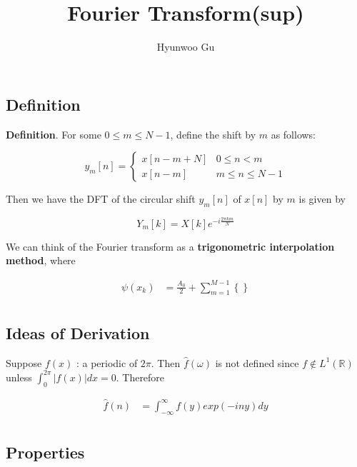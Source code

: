 \documentclass[12pt]{article}
\theoremstyle{nonumberbreak}
\begin{document}
\title{\textbf{Fourier Transform(sup)}}
\author{Hyunwoo Gu}
\date{}

\maketitle

\subsection*{Definition}


\begin{theorem}
\textbf{Definition}. For some $0 \le m \le N-1$, define the shift by $m$ as follows:

$$
y_m[n] = \begin{cases} 
x[n-m+N] & 0 \le n < m \\
x[n-m] & m \le n \le N-1
\end{cases}
$$

Then we have the DFT of the circular shift $y_m[n]$ of $x[n]$ by $m$ is given by

$$
Y_m[k] = X[k] e^{-i \frac{2\pi km}{N}}
$$
\end{theorem}

We can think of the Fourier transform as a \textbf{trigonometric interpolation method}, where 

$$
\begin{aligned}
\psi(x_k) &= \frac{A_0}{2} + \sum_{m=1}^{M-1} \left\{ \right\} \\[8pt]
\end{aligned}
$$


\subsection*{Ideas of Derivation}

Suppose $f(x)$ : a periodic of $2\pi$. Then $\hat{f}(\omega)$ is not defined since $f \notin L^1(\mathbb{R})$ unless $\int_0^{2\pi} |f(x)| dx = 0$. Therefore

$$
\begin{aligned}
\hat{f}(n) &= \int_{-\infty}^\infty f(y) exp(-iny) dy \\[8pt]
\end{aligned}
$$




\subsection*{Properties}
\end{document}
